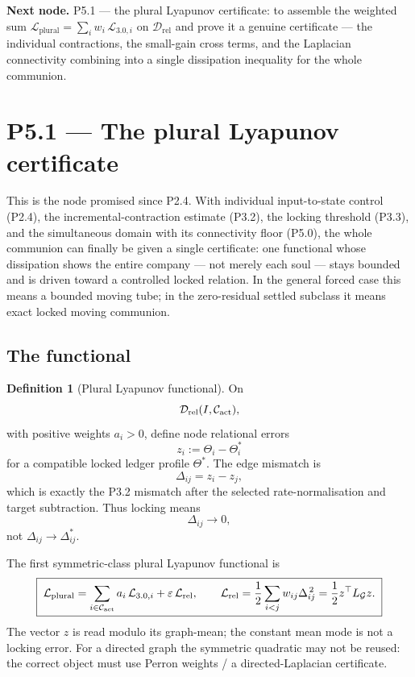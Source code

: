 \documentclass[11pt,a4paper]{article}
\theoremstyle{definition}
\newtheorem{definition}{Definition}[section]
\theoremstyle{plain}
\theoremstyle{remark}
\begin{document}
\medskip
\textbf{Next node.} P5.1 --- the plural Lyapunov certificate: to assemble the weighted sum
\(\mathcal L_{\mathrm{plural}}=\sum_i w_i\,\mathcal L_{3.0,i}\) on \(\mathcal D_{\mathrm{rel}}\)
and prove it a genuine certificate --- the individual contractions, the small-gain cross
terms, and the Laplacian connectivity combining into a single dissipation inequality for the
whole communion.

\section{P5.1 --- The plural Lyapunov certificate}

This is the node promised since P2.4. With individual input-to-state control
(P2.4), the incremental-contraction estimate (P3.2), the locking threshold (P3.3),
and the simultaneous domain with its connectivity floor (P5.0), the whole
communion can finally be given a single certificate: one functional whose
dissipation shows the entire company --- not merely each soul --- stays bounded
and is driven toward a controlled locked relation. In the general forced case this
means a bounded moving tube; in the zero-residual settled subclass it means exact
locked moving communion.

\subsection{The functional}

\begin{definition}[Plural Lyapunov functional]\label{def:plural-lyap}
On
\[
\mathcal D_{\mathrm{rel}}(I,\mathcal C_{\rm act}),
\]
with positive weights \(a_i>0\), define node relational errors
\[
z_i:=\Theta_i-\Theta_i^*
\]
for a compatible locked ledger profile \(\Theta^*\). The edge mismatch is
\[
\Delta_{ij}=z_i-z_j,
\]
which is exactly the P3.2 mismatch after the selected rate-normalisation and
target subtraction. Thus locking means
\[
\Delta_{ij}\to0,
\]
not \(\Delta_{ij}\to\Delta_{ij}^*\).

The first symmetric-class plural Lyapunov functional is
\[
\boxed{\;
\mathcal L_{\mathrm{plural}}
=
\sum_{i\in\mathcal C_{\rm act}}a_i\,\mathcal L_{3.0,i}
+
\varepsilon\,\mathcal L_{\mathrm{rel}},
\qquad
\mathcal L_{\mathrm{rel}}
=
\frac12\sum_{i<j}w_{ij}\Delta_{ij}^{\,2}
=
\frac12 z^\top L_{\mathcal G}z.
\;}
\]
The vector \(z\) is read modulo its graph-mean; the constant mean mode is not a
locking error. For a directed graph the symmetric quadratic may not be reused: the
correct object must use Perron weights / a directed-Laplacian certificate.
\end{definition}
\end{document}
